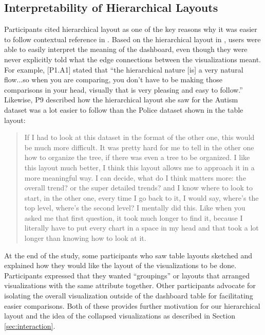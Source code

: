 \subsection{Interpretability of Hierarchical Layouts}
\par Participants cited hierarchical layout as one of the key reasons why it was easier to follow contextual reference in \system. Based on the hierarchical layout in \system, users were able to easily interpret the meaning of the dashboard, even though they were never explicitly told what the edge connections between the visualizations meant. For example, [P1.A1] stated that ``the hierarchical nature [is] a very natural flow...so when you are comparing, you don't have to be making those comparisons in your head, visually that is very pleasing and easy to follow.'' %
Likewise, P9 described how the hierarchical layout she saw for the Autism dataset was a lot easier to follow than the Police dataset shown in the table layout:
\begin{quote}
If I had to look at this dataset in the format of the other one, this would be much more difficult. It was pretty hard for me to tell in the other one how to organize the tree, if there was even a tree to be organized. I like this layout much better, I think this layout allows me to approach it in a more meaningful way. I can decide, what do I think matters more: the overall trend? or the super detailed trends? and I know where to look to start, in the other one, every time I go back to it, I would say, where's the top level, where's the second level? I mentally did this. Like when you asked me that first question, it took much longer to find it, because I literally have to put every chart in a space in my head and that took a lot longer than knowing how to look at it.
\end{quote}
At the end of the study, some participants who saw table layouts sketched and explained how they would like the layout of the visualizations to be done. Participants expressed that they wanted ``groupings'' or layouts that arranged visualizations with the same attribute together. Other participants advocate for isolating the overall visualization outside of the dashboard table for facilitating easier comparisons. Both of these provides further motivation for our hierarchical layout and the idea of the collapsed visualizations as described in Section \ref{sec:interaction}.
